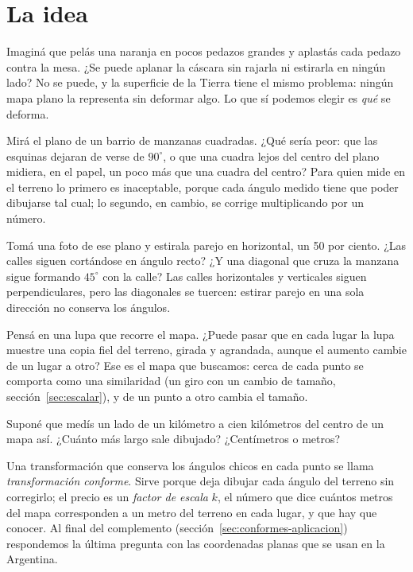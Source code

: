 \label{cap:conformes}


\section{La idea}

Imaginá que pelás una naranja en pocos pedazos grandes y aplastás cada pedazo contra la mesa.
¿Se puede aplanar la cáscara sin rajarla ni estirarla en ningún lado?
No se puede, y la superficie de la Tierra tiene el mismo problema: ningún mapa plano la
representa sin deformar algo. Lo que sí podemos elegir es \emph{qué} se deforma.

Mirá el plano de un barrio de manzanas cuadradas.
¿Qué sería peor: que las esquinas dejaran de verse de \(90^\circ\), o que una cuadra lejos del centro del plano midiera, en el papel, un poco más que una cuadra del centro?
Para quien mide en el terreno lo primero es inaceptable, porque cada ángulo medido tiene que
poder dibujarse tal cual; lo segundo, en cambio, se corrige multiplicando por un número.

Tomá una foto de ese plano y estirala parejo en horizontal, un 50 por ciento.
¿Las calles siguen cortándose en ángulo recto? ¿Y una diagonal que cruza la manzana sigue formando \(45^\circ\) con la calle?
Las calles horizontales y verticales siguen perpendiculares, pero las diagonales se tuercen:
estirar parejo en una sola dirección no conserva los ángulos.

Pensá en una lupa que recorre el mapa.
¿Puede pasar que en cada lugar la lupa muestre una copia fiel del terreno, girada y agrandada, aunque el aumento cambie de un lugar a otro?
Ese es el mapa que buscamos: cerca de cada punto se comporta como una similaridad (un giro con
un cambio de tamaño, sección~\ref{sec:escalar}), y de un punto a otro cambia el tamaño.

Suponé que medís un lado de un kilómetro a cien kilómetros del centro de un mapa así.
¿Cuánto más largo sale dibujado? ¿Centímetros o metros?

Una transformación que conserva los ángulos chicos en cada punto se llama
\emph{transformación conforme}. Sirve porque deja dibujar cada ángulo del terreno sin
corregirlo; el precio es un \emph{factor de escala} \(k\), el número que dice cuántos metros
del mapa corresponden a un metro del terreno en cada lugar, y que hay que conocer. Al final
del complemento (sección~\ref{sec:conformes-aplicacion}) respondemos la última pregunta con
las coordenadas planas que se usan en la Argentina.

